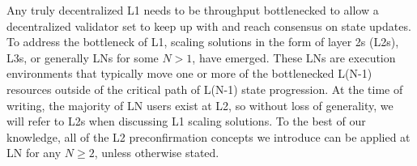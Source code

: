 \documentclass[a4paper]{article}
\theoremstyle{boldstyle}
\newcommand{\ks}[1]{\textcolor{purple}{\textbf{Katerina:} #1}}
\begin{document}
\begin{enumerate}
\end{enumerate} 

\iffalse

Any truly decentralized L1 needs to be throughput bottlenecked to allow a decentralized validator set to keep up with and reach consensus on state updates. To address the bottleneck of L1, scaling solutions in the form of layer 2s (L2s), L3s, or generally LNs for some $N>1$, have emerged. These LNs are execution environments that typically move one or more of the bottlenecked L(N-1) resources outside of the critical path of L(N-1) state progression. At the time of writing, the majority of LN users exist at L2, so without loss of generality, we will refer to L2s when discussing L1 scaling solutions. To the best of our knowledge, all of the L2 preconfirmation concepts we introduce can be applied at LN for any $N\geq 2$, unless otherwise stated.
\end{document}
